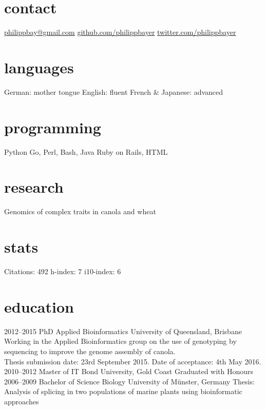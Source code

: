 \documentclass[]{friggeri-cv} %
\begin{document}


\begin{aside} %
\section{contact}
\href{mailto:philippbay@gmail.com}{philippbay@gmail.com}
\href{http://github.com/philippbayer}{github.com/philippbayer}
\href{http://twitter.com/philippbayer}{twitter.com/philippbayer}
\section{languages}
German: mother tongue
English: fluent
French \& Japanese: advanced
\section{programming}
Python
Go, Perl, Bash, Java
Ruby on Rails, HTML
\section{research}
Genomics of complex traits in canola and wheat
\section{stats}
Citations: 492
h-index: 7
i10-index: 6
\end{aside}


\section{education}

\begin{entrylist}
\entry
{2012--2015}
{PhD {\normalfont Applied Bioinformatics}}
{University of Queensland, Brisbane}
{Working in the Applied Bioinformatics group on the use of genotyping by sequencing to improve the genome assembly of canola.\\Thesis submission date: 23rd September 2015. Date of acceptance: 4th May 2016.}
\entry
{2010--2012}
{Master {\normalfont of IT}}
{Bond University, Gold Coast}
{Graduated with Honours}
\entry
{2006--2009}
{Bachelor of Science {\normalfont Biology}}
{University of Münster, Germany}
{Thesis: Analysis of splicing in two populations of marine plants
using bioinformatic approaches}
\end{entrylist}
\end{document}
